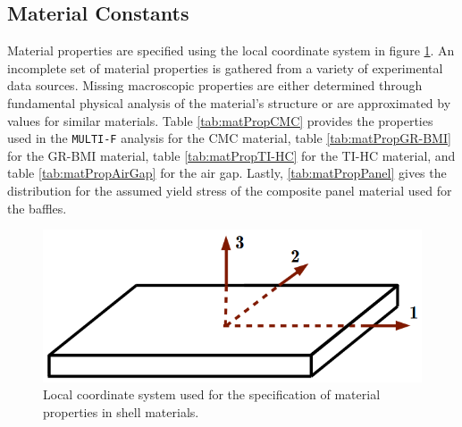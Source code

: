 \documentclass{article}
\begin{document}
\subsection{Material Constants}

Material properties are specified using the local coordinate system in figure \ref{fig:materialCoordinateSystem}. An incomplete set of material properties is gathered from a variety of experimental data sources. Missing macroscopic properties are either determined through fundamental physical analysis of the material's structure or are approximated by values for similar materials. Table \ref{tab:matPropCMC} provides the properties used in the \texttt{MULTI-F} analysis for the CMC material, table \ref{tab:matPropGR-BMI} for the GR-BMI material, table \ref{tab:matPropTI-HC} for the TI-HC material, and table \ref{tab:matPropAirGap} for the air gap. Lastly, \ref{tab:matPropPanel} gives the distribution for the assumed yield stress of the composite panel material used for the baffles.

\begin{figure}
\caption{Local coordinate system used for the specification of material properties in shell materials.}
\label{fig:materialCoordinateSystem}
\begin{center}
\includegraphics[scale=0.3]{figs/material_directions.png}
\end{center}
\end{figure}
\end{document}

